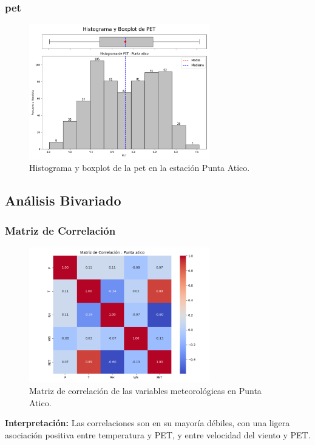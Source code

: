 \subsubsection*{\gls{pet} }
\begin{figure}[htbp]
\centering
\includegraphics[width=0.7\textwidth]{resultados/por_estacion_meteorologica/Punta_Atico/PET_histograma.png}
\caption{Histograma y boxplot de la \gls{pet}  en la estación Punta Atico.}
\label{fig:punta_atico_PET}
\end{figure}

\subsection{Análisis Bivariado}

\subsubsection*{Matriz de Correlación}
\begin{figure}[htbp]
\centering
\includegraphics[width=0.7\textwidth]{resultados/por_estacion_meteorologica/Punta_Atico/matriz_correlacion.png}
\caption{Matriz de correlación de las variables meteorológicas en Punta Atico.}
\label{fig:punta_atico_corr}
\end{figure}
\textbf{Interpretación:} Las correlaciones son en su mayoría débiles, con una ligera asociación positiva entre temperatura y PET, y entre velocidad del viento y PET.


